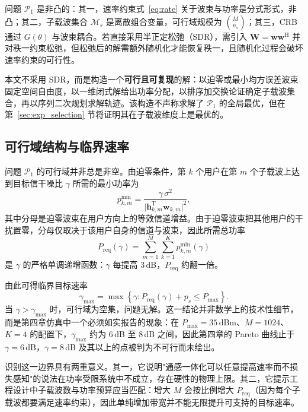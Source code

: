 问题 $\mathcal{P}_{1}$ 是非凸的：其一，速率约束式~\eqref{eq:rate} 关于波束与功率是分式形式，非凸；其二，子载波集合 $\mathcal{M}_{s}$ 是离散组合变量，可行域规模为 $\binom{M}{n_{s}}$；其三，CRB 通过 $G(\theta)$ 与波束耦合。若直接采用半正定松弛（SDR），需引入 $\mathbf{W}=\mathbf{w}\mathbf{w}^{\mathrm{H}}$ 并对秩一约束松弛，但松弛后的解需额外随机化才能恢复秩一，且随机化过程会破坏速率约束的可行性。

本文不采用 SDR，而是构造一个\textbf{可行且可复现}的解：以迫零或最小均方误差波束固定空间自由度，以一维闭式解给出功率分配，以排序加交换论证确定子载波集合，再以序列二次规划求解轨迹。该构造不声称求解了 $\mathcal{P}_{1}$ 的全局最优，但在第~\ref{sec:exp_selection} 节将证明其在子载波维度上是最优的。

\subsection{可行域结构与临界速率}
\label{sec:feasibility}

问题 $\mathcal{P}_{1}$ 的可行域并非总是非空。由迫零条件，第 $k$ 个用户在第 $m$ 个子载波上达到目标信干噪比 $\gamma$ 所需的最小功率为
\begin{equation}
  p_{k,m}^{\min} = \frac{\gamma\,\sigma^{2}}{\lvert\mathbf{h}_{k,m}^{\mathrm{T}}\mathbf{w}_{k,m}\rvert^{2}},
  \label{eq:pmin}
\end{equation}
其中分母是迫零波束在用户方向上的等效信道增益。由于迫零波束把其他用户的干扰置零，分母仅取决于该用户自身的信道与波束，因此所需总功率
\begin{equation}
  P_{\mathrm{req}}(\gamma) = \sum_{m=1}^{M}\sum_{k=1}^{K} p_{k,m}^{\min}(\gamma)
  \label{eq:preq_sum}
\end{equation}
是 $\gamma$ 的严格单调递增函数：$\gamma$ 每提高 3\,dB，$P_{\mathrm{req}}$ 约翻一倍。

由此可得临界目标速率
\begin{equation}
  \gamma_{\max} = \max\left\{\gamma : P_{\mathrm{req}}(\gamma) + p_{s} \le P_{\max}\right\}.
  \label{eq:gmax}
\end{equation}
当 $\gamma > \gamma_{\max}$ 时，可行域为空集，问题无解。这一结论并非数学上的技术性细节，而是第四章仿真中一个必须如实报告的现象：在 $P_{\max}=35$\,dBm、$M=1024$、$K=4$ 的配置下，$\gamma_{\max}$ 约为 6\,dB 至 8\,dB 之间，因此第四章的 Pareto 曲线止于 $\gamma = 6$\,dB，$\gamma = 8$\,dB 及其以上的点被判为不可行而未绘出。

识别这一边界具有两重意义。其一，它说明"通感一体化可以任意提高速率而不损失感知"的说法在功率受限系统中不成立，存在硬性的物理上限。其二，它提示工程设计中子载波数与功率预算应当匹配：增大 $M$ 会按比例增大 $P_{\mathrm{req}}$（因为每个子载波都要满足速率约束），因此单纯增加带宽并不能无限提升可支持的目标速率。

